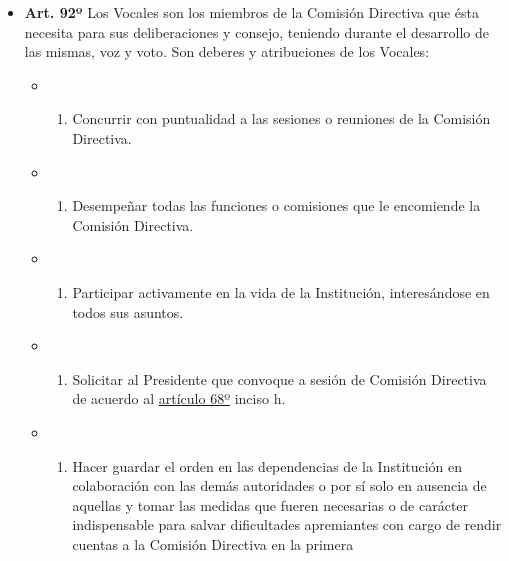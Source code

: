 \documentclass[]{book}
\providecommand{\tightlist}{%
  \setlength{\itemsep}{0pt}\setlength{\parskip}{0pt}}
\begin{document}
\begin{itemize}
\tightlist
\item
  \textbf{Art. 92º} Los Vocales son los miembros de la Comisión
  Directiva que ésta necesita para sus deliberaciones y consejo,
  teniendo durante el desarrollo de las mismas, voz y voto. Son deberes
  y atribuciones de los Vocales:

  \begin{itemize}
  \item
    \begin{enumerate}
    \def\labelenumi{\alph{enumi})}
    \tightlist
    \item
      Concurrir con puntualidad a las sesiones o reuniones de la
      Comisión Directiva.
    \end{enumerate}
  \item
    \begin{enumerate}
    \def\labelenumi{\alph{enumi})}
    \setcounter{enumi}{1}
    \tightlist
    \item
      Desempeñar todas las funciones o comisiones que le encomiende la
      Comisión Directiva.
    \end{enumerate}
  \item
    \begin{enumerate}
    \def\labelenumi{\alph{enumi})}
    \setcounter{enumi}{2}
    \tightlist
    \item
      Participar activamente en la vida de la Institución, interesándose
      en todos sus asuntos.
    \end{enumerate}
  \item
    \begin{enumerate}
    \def\labelenumi{\alph{enumi})}
    \setcounter{enumi}{3}
    \tightlist
    \item
      Solicitar al Presidente que convoque a sesión de Comisión
      Directiva de acuerdo al \protect\hyperlink{art68}{artículo 68º}
      inciso h.
    \end{enumerate}
  \item
    \begin{enumerate}
    \def\labelenumi{\alph{enumi})}
    \setcounter{enumi}{4}
    \tightlist
    \item
      Hacer guardar el orden en las dependencias de la Institución en
      colaboración con las demás autoridades o por sí solo en ausencia
      de aquellas y tomar las medidas que fueren necesarias o de
      carácter indispensable para salvar dificultades apremiantes con
      cargo de rendir cuentas a la Comisión Directiva en la primera

\end{enumerate}
\end{itemize}
\end{itemize}
\end{document}
